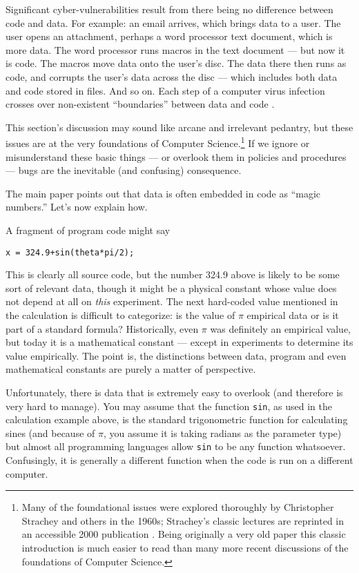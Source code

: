 \documentclass{article}
\begin{document}
{Significant cyber-vulnerabilities result from there being no difference between code and data. For example: an email arrives, which brings data to a user. The user opens an attachment, perhaps a word processor text document, which is more data. The word processor runs macros in the text document --- but now it is code. The macros move data onto the user's disc. The data there then runs as code, and corrupts the user's data across the disc --- which includes both data and code stored in files. And so on. Each step of a computer virus infection crosses over non-existent ``boundaries'' between data and code \cite{viruses}.}

This section's discussion may sound like arcane and irrelevant pedantry, but these issues are at the very foundations of Computer Science.\footnote{{Many of the foundational issues were explored thoroughly by Christopher Strachey and others in the 1960s; Strachey's classic lectures are reprinted in an accessible 2000 publication \cite{strachey}. Being originally a very old paper this classic introduction is much easier to read than many more recent discussions of the foundations of Computer Science.}} If we ignore or misunderstand these basic things --- or overlook them in policies and procedures --- bugs are the inevitable (and confusing) consequence.

The main paper points out that data is often embedded in code as ``magic numbers.'' Let's now explain how. 

A fragment of program code might say

\begin{center}\texttt{x = 324.9+sin(theta*pi/2);}\end{center}

This is clearly all source code, but the number 324.9 above is likely to be some sort of relevant data, though it might be a physical constant whose value does not depend at all on \emph{this\/} experiment. The next hard-coded value mentioned in the calculation is difficult to categorize: is the value of $\pi$ empirical data or is it part of a standard formula? Historically, even $\pi$ was definitely an empirical value, but today it is a mathematical constant --- except in experiments to determine its value empirically. The point is, the distinctions between data, program and even mathematical constants are purely a matter of perspective.

Unfortunately, there is data that is extremely easy to overlook (and therefore is very hard to manage). You may assume that the function \texttt{sin}, as used in the calculation example above, is the standard trigonometric function for calculating sines (and because of $\pi$, you assume it is taking radians as the parameter type) but almost all programming languages allow \texttt{sin} to be any function whatsoever. Confusingly, it is generally a different function when the code is run on a different computer.
\end{document}
